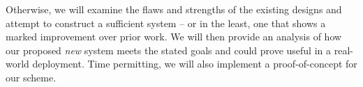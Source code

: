 \documentclass[10pt]{article}
\begin{document}
\begin{multicols}{2}
			Otherwise, we will examine the flaws and strengths of the existing designs and attempt to
			construct a sufficient system -- or in the least, one that shows a marked improvement over
			prior work. We will then provide an analysis of how our proposed \emph{new} system meets the
			stated goals and could prove useful in a real-world deployment. Time permitting, we will also
			implement a proof-of-concept for our scheme.

	\end{multicols}

	{}
	
\end{document}
